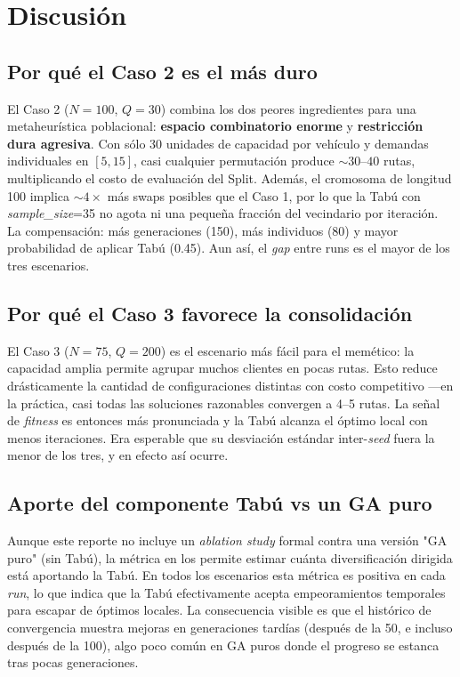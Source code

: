 \section{Discusión}
\label{sec:discusion}

\subsection{Por qué el Caso 2 es el más duro}

El Caso 2 ($N=100$, $Q=30$) combina los dos peores ingredientes para una metaheurística poblacional: \textbf{espacio combinatorio enorme} y \textbf{restricción dura agresiva}. Con sólo 30 unidades de capacidad por vehículo y demandas individuales en $[5, 15]$, casi cualquier permutación produce $\sim 30$--$40$ rutas, multiplicando el costo de evaluación del Split. Además, el cromosoma de longitud 100 implica $\sim 4 \times$ más swaps posibles que el Caso 1, por lo que la Tabú con \emph{sample\_size}=35 no agota ni una pequeña fracción del vecindario por iteración. La compensación: más generaciones (150), más individuos (80) y mayor probabilidad de aplicar Tabú (0.45). Aun así, el \emph{gap} entre runs es el mayor de los tres escenarios.

\subsection{Por qué el Caso 3 favorece la consolidación}

El Caso 3 ($N=75$, $Q=200$) es el escenario más fácil para el memético: la capacidad amplia permite agrupar muchos clientes en pocas rutas. Esto reduce drásticamente la cantidad de configuraciones distintas con costo competitivo —en la práctica, casi todas las soluciones razonables convergen a 4--5 rutas. La señal de \emph{fitness} es entonces más pronunciada y la Tabú alcanza el óptimo local con menos iteraciones. Era esperable que su desviación estándar inter-\emph{seed} fuera la menor de los tres, y en efecto así ocurre.

\subsection{Aporte del componente Tabú vs un GA puro}

Aunque este reporte no incluye un \emph{ablation study} formal contra una versión "GA puro" (sin Tabú), la métrica  en los  permite estimar cuánta diversificación dirigida está aportando la Tabú. En todos los escenarios esta métrica es positiva en cada \emph{run}, lo que indica que la Tabú efectivamente acepta empeoramientos temporales para escapar de óptimos locales. La consecuencia visible es que el histórico de convergencia muestra mejoras en generaciones tardías (después de la 50, e incluso después de la 100), algo poco común en GA puros donde el progreso se estanca tras pocas generaciones.

